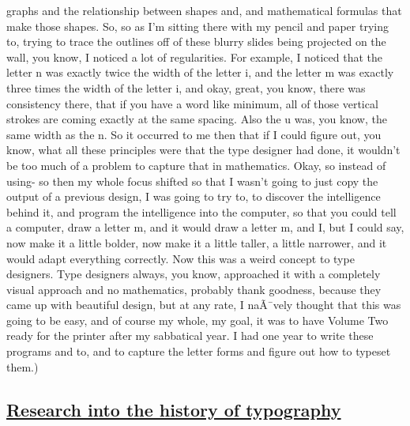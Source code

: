 \documentclass[]{article}
\begin{document}
graphs and the relationship between shapes and, and mathematical
formulas that make those shapes. So, so as I'm sitting there with my
pencil and paper trying to, trying to trace the outlines off of these
blurry slides being projected on the wall, you know, I noticed a lot of
regularities. For example, I noticed that the letter n was exactly twice
the width of the letter i, and the letter m was exactly three times the
width of the letter i, and okay, great, you know, there was consistency
there, that if you have a word like minimum, all of those vertical
strokes are coming exactly at the same spacing. Also the u was, you
know, the same width as the n. So it occurred to me then that if I could
figure out, you know, what all these principles were that the type
designer had done, it wouldn't be too much of a problem to capture that
in mathematics. Okay, so instead of using- so then my whole focus
shifted so that I wasn't going to just copy the output of a previous
design, I was going to try to, to discover the intelligence behind it,
and program the intelligence into the computer, so that you could tell a
computer, draw a letter m, and it would draw a letter m, and I, but I
could say, now make it a little bolder, now make it a little taller, a
little narrower, and it would adapt everything correctly. Now this was a
weird concept to type designers. Type designers always, you know,
approached it with a completely visual approach and no mathematics,
probably thank goodness, because they came up with beautiful design, but
at any rate, I naÃ¯vely thought that this was going to be easy, and of
course my whole, my goal, it was to have Volume Two ready for the
printer after my sabbatical year. I had one year to write these programs
and to, and to capture the letter forms and figure out how to typeset
them.)

\subsection{\texorpdfstring{\href{http://webofstories.com/play/17113}{Research
into the history of
typography}}{Research into the history of typography}}\label{research-into-the-history-of-typography}
\end{document}
